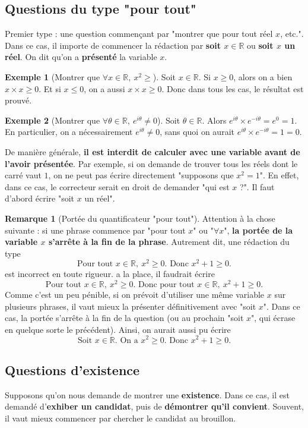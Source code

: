 \documentclass[french]{book}
\newcommand{\R}{\mathbb{R}}
\theoremstyle{plain}
\theoremstyle{definition}
\newtheorem{exa}{Exemple}[chapter]
\newtheorem{rmq}{Remarque}[chapter]
\theoremstyle{remark}
\begin{document}
\subsection{Questions du type "pour tout"}
Premier type : une question commençant par "montrer que pour tout réel $x$, etc.". Dans ce cas, il importe de commencer la rédaction par \textbf{soit $x\in\R$} ou \textbf{soit $x$ un réel}. On dit qu'on a \textbf{présenté} la variable $x$.
\begin{exa}[Montrer que $\forall x\in\R,\ x^2\geqslant$]
	Soit $x\in\R$. Si $x\geqslant0$, alors on a bien $x\times x\geqslant0$. Et si $x\leqslant0$, on a aussi $x\times x\geqslant0$. Donc dans tous les cas, le résultat est prouvé.
\end{exa}
\begin{exa}[Montrer que $\forall\theta\in\R,\ e^{i\theta}\ne0$]
	Soit $\theta\in\R$. Alors $e^{i\theta}\times e^{-i\theta}=e^0=1$. En particulier, on a nécessairement $e^{i\theta}\ne0$, sans quoi on aurait $e^{i\theta}\times e^{-i\theta}=1=0$.
\end{exa}
De manière générale, \textbf{il est interdit de calculer avec une variable avant de l'avoir présentée}. Par exemple, si on demande de trouver tous les réels dont le carré vaut $1$, on ne peut pas écrire directement "supposons que $x^2=1$". En effet, dans ce cas, le correcteur serait en droit de demander "qui est $x$ ?". Il faut d'abord écrire "soit $x$ un réel".
\begin{rmq}[Portée du quantificateur "pour tout"]
	Attention à la chose suivante : si une phrase commence par "pour tout $x$" ou "$\forall x$", \textbf{la portée de la variable $x$ s'arrête à la fin de la phrase}. Autrement dit, une rédaction du type $$\text{Pour tout }x\in\R,\ x^2\geqslant0.\text{ Donc } x^2+1\geqslant0.$$ est incorrect en toute rigueur. a la place, il faudrait écrire $$\text{Pour tout }x\in\R,\ x^2\geqslant0.\text{ Donc pour tout }x\in\R,\ x^2+1\geqslant0.$$ Comme c'est un peu pénible, si on prévoit d'utiliser une même variable $x$ sur plusieurs phrases, il vaut mieux la présenter définitivement avec "soit $x$". Dans ce cas, la portée s'arrête à la fin de la question (ou au prochain "soit $x$", qui écrase en quelque sorte le précédent). Ainsi, on aurait aussi pu écrire $$\text{Soit }x\in\R. \text{ On a }x^2\geqslant0.\text{ Donc }x^2+1\geqslant0.$$
\end{rmq}
\subsection{Questions d'existence}
Supposons qu'on nous demande de montrer une \textbf{existence}. Dans ce cas, il est demandé d'\textbf{exhiber un candidat}, puis de \textbf{démontrer qu'il convient}. Souvent, il vaut mieux commencer par chercher le candidat au brouillon.
\end{document}

